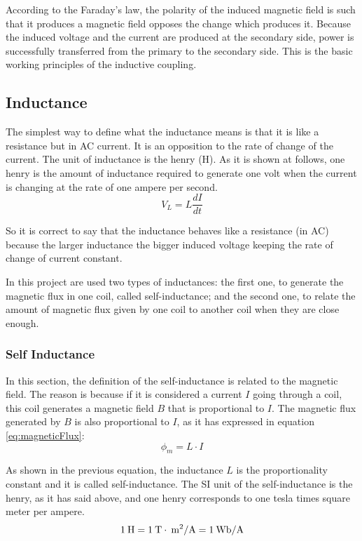 According to the Faraday's law, the polarity of the induced magnetic field is such that it produces a magnetic field opposes the change which produces it. Because the induced voltage and the current are produced at the secondary side, power is successfully transferred from the primary to the secondary side. This is the basic working principles of the inductive coupling.

		\subsection{Inductance}
The simplest way to define what the inductance means is that it is like a resistance but in AC current. It is an opposition to the rate of change of the current. The unit of inductance is the henry (H). As it is shown at follows, one henry is the amount of inductance required to generate one volt when the current is changing at the rate of one ampere per second.
\begin{equation}
{V_L} = L\frac{dI}{dt}
\end{equation}

So it is correct to say that the inductance behaves like a resistance (in AC) because the larger inductance the bigger induced voltage keeping the rate of change of current constant.

In this project are used two types of inductances: the first one, to generate the magnetic flux in one coil, called self-inductance; and the second one, to relate the amount of magnetic flux given by one coil to another coil when they are close enough.

			\subsubsection{Self Inductance}
In this section, the definition of the self-inductance is related to the magnetic field. The reason is because if it is considered a current $I$ going through a coil, this coil generates a magnetic field $B$ that is proportional to $I$\cite{tipler}. The magnetic flux generated by $B$ is also proportional to $I$, as it has expressed in equation \ref{eq:magneticFlux}:
\begin{equation}
\phi_m = L\cdot I
\label{eq:magneticFlux}
\end{equation}

As shown in the previous equation, the inductance $L$ is the proportionality constant and it is called self-inductance. The SI unit of the self-inductance is the henry, as it has said above, and one henry corresponds to one tesla times square meter per ampere.
\begin{equation*}
1\:\textnormal{H} = 1\:\textnormal{T}\cdot\:\textnormal{m}^2/\textnormal{A} = 1\:\textnormal{Wb/A}
\end{equation*}

